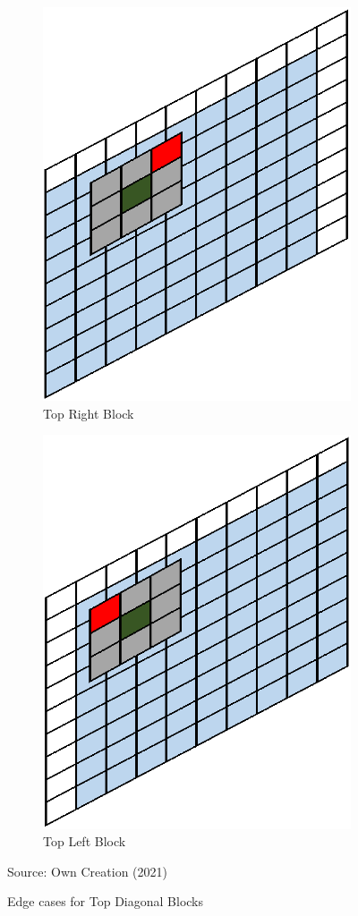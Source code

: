 \begin{figure}[H]
\centering
\begin{subfigure}{.4\textwidth}
  \centering
  \includegraphics[width=.5\linewidth]{Figures/Chapter3/topright}
  \caption{Top Right Block}
\end{subfigure}%
\begin{subfigure}{.4\textwidth}
  \centering
  \includegraphics[width=.5\linewidth]{Figures/Chapter3/topleft}
  \caption{Top Left Block}
\end{subfigure}
\caption{Edge cases for Top Diagonal Blocks}
\begin{center}
Source: Own Creation (2021)
\end{center}
\label{fig:e2}
\end{figure}

